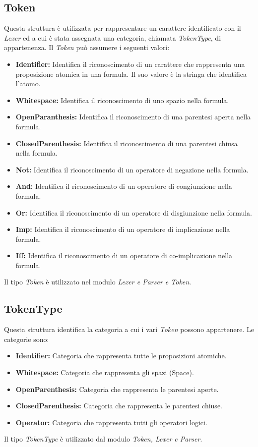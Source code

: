 \documentclass[\main/tesi.tex]{subfiles}
\begin{document}
\subsection{Token}
Questa struttura è utilizzata per rappresentare un carattere identificato con il \textit{Lexer} ed a cui è stata assegnata una categoria, chiamata \textit{TokenType}, di appartenenza. Il \textit{Token} può assumere i seguenti valori:
\begin{itemize}
    \item \textbf{Identifier:} Identifica il riconoscimento di un carattere che rappresenta una proposizione atomica in una formula. Il suo valore è la stringa che identifica l'atomo.
    \item \textbf{Whitespace:} Identifica il riconoscimento di uno spazio nella formula.
    \item \textbf{OpenParanthesis:} Identifica il riconoscimento di una parentesi aperta nella formula.
    \item \textbf{ClosedParenthesis:} Identifica il riconoscimento di una parentesi chiusa nella formula.
    \item \textbf{Not:} Identifica il riconoscimento di un operatore di negazione nella formula.
    \item \textbf{And:} Identifica il riconoscimento di un operatore di congiunzione nella formula.
    \item \textbf{Or:} Identifica il riconoscimento di un operatore di disgiunzione nella formula.
    \item \textbf{Imp:} Identifica il riconoscimento di un operatore di implicazione nella formula.
    \item \textbf{Iff:} Identifica il riconoscimento di un operatore di co-implicazione nella formula.
\end{itemize}
Il tipo \textit{Token} è utilizzato nel modulo \textit{Lexer e Parser e Token}.

\subsection{TokenType}
Questa struttura identifica la categoria a cui i vari \textit{Token} possono appartenere. Le categorie sono:
\begin{itemize}
    \item \textbf{Identifier:} Categoria che rappresenta tutte le proposizioni atomiche.
    \item \textbf{Whitespace:} Categoria che rappresenta gli spazi (Space).
    \item \textbf{OpenParenthesis:} Categoria che rappresenta le parentesi aperte.
    \item \textbf{ClosedParenthesis:} Categoria che rappresenta le parentesi chiuse.
    \item \textbf{Operator:} Categoria che rappresenta tutti gli operatori logici.
\end{itemize}
Il tipo \textit{TokenType} è utilizzato dal modulo \textit{Token, Lexer e Parser}.
\end{document}
